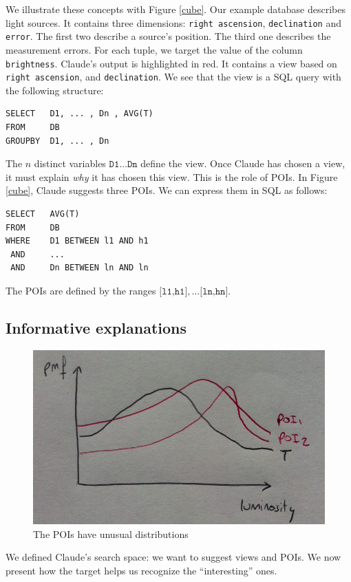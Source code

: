 We illustrate these concepts with Figure \ref{cube}. Our example database
describes light sources.  It contains three dimensions: \texttt{right
ascension}, \texttt{declination} and \texttt{error}. The first two describe a
source's position. The third one describes the measurement errors. For each
tuple, we target the value of the column \texttt{brightness}. Claude's output
is highlighted in red. It contains a view based on \texttt{right ascension},
and \texttt{declination}. We see that the view is a SQL query with the
following structure:
\begin{verbatim}
SELECT   D1, ... , Dn , AVG(T)
FROM     DB 
GROUPBY  D1, ... , Dn
\end{verbatim}
The $n$ distinct variables $\texttt{D1} \ldots \texttt{Dn}$ define the view. Once
Claude has chosen a view, it must explain \emph{why} it has chosen this view.
This is the role of POIs. In Figure \ref{cube}, Claude suggests three POIs. We
can express them in SQL as follows:
\begin{verbatim}
SELECT   AVG(T)
FROM     DB
WHERE    D1 BETWEEN l1 AND h1
 AND     ...
 AND     Dn BETWEEN ln AND ln
\end{verbatim}
The POIs are defined by the ranges $\texttt{[l1,h1]}, \dots \texttt{[ln,hn]}$.


\subsection{Informative explanations}
\label{sec:infor}
\begin{figure}[t!]
\centering
\includegraphics[width=\columnwidth]{images/poi}
\caption{The POIs have unusual distributions}
\label{poi}
\end{figure}

We defined Claude's search space: we want to suggest views and POIs. We now
present how the target helps us recognize the ``interesting'' ones. 

